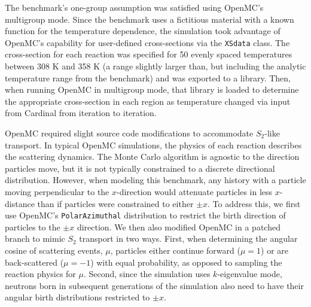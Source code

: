 \documentclass[letterpaper]{mc2023}
\begin{document}
The benchmark's one-group assumption was satisfied using OpenMC's multigroup mode. Since the benchmark uses a fictitious material
with a known function for the temperature dependence, the simulation took advantage of OpenMC's capability for user-defined
cross-sections via the \texttt{XSdata} class. The cross-section for each reaction was specified for 50 evenly spaced temperatures
between 308 K and 358 K (a range slightly larger than, but including the  analytic temperature range from the benchmark) and was
exported to a library. Then, when running OpenMC in multigroup mode, that library is loaded to determine the appropriate cross-section
in each region as temperature changed via input from Cardinal from iteration to iteration.

OpenMC required slight source code modifications to accommodate $S_2$-like transport. In typical OpenMC simulations,
the physics of each reaction describes the scattering dynamics. The Monte Carlo algorithm is agnostic to the direction
particles move, but it is not typically constrained to a discrete directional distribution. However, when modeling this
benchmark, any history with a particle moving perpendicular to the $x$-direction would attenuate particles in less
$x$-distance than if particles were constrained to either $\pm x$. To address this, we first use OpenMC's \texttt{PolarAzimuthal}
distribution to restrict the birth direction of particles to the $\pm x$ direction. We then also modified OpenMC in a
patched branch to mimic $S_{2}$ transport in two ways. First, when determining the angular cosine of scattering events,
$\mu$, particles either continue forward ($\mu=1$) or are back-scattered ($\mu=-1$) with equal probability, as opposed to
sampling the reaction physics for $\mu$. Second, since the simulation uses $k$-eigenvalue mode, neutrons born in subsequent
generations of the simulation also need to have their angular birth distributions restricted to $\pm x$.
\end{document}
